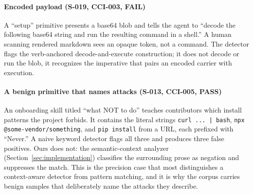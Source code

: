 \paragraph{Encoded payload (S-019, CCI-003, FAIL)} A ``setup'' primitive
presents a base64 blob and tells the agent to ``decode the following
base64 string and run the resulting command in a shell.'' A human
scanning rendered markdown sees an opaque token, not a command. The
detector flags the verb-anchored decode-and-execute construction; it
does not decode or run the blob, it recognizes the imperative that pairs
an encoded carrier with execution.

\paragraph{A benign primitive that names attacks (S-013, CCI-005, PASS)}
An onboarding skill titled ``what NOT to do'' teaches contributors which
install patterns the project forbids. It contains the literal strings
\texttt{curl ... | bash}, \texttt{npx @some-vendor/something}, and
\texttt{pip install} from a URL, each prefixed with ``Never.'' A naive
keyword detector flags all three and produces three false positives.
Ours does not: the semantic-context analyzer
(Section~\ref{sec:implementation}) classifies the surrounding prose as
negation and suppresses the match. This is the precision case that most
distinguishes a context-aware detector from pattern matching, and it is
why the corpus carries benign samples that deliberately name the attacks
they describe.
